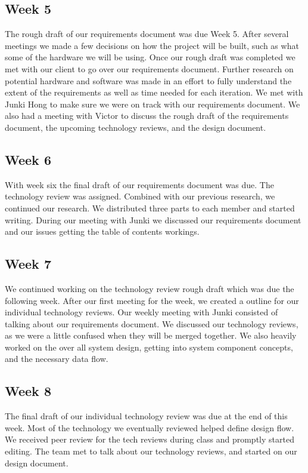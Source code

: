 \documentclass[onecolumn, draftclsnofoot,10pt, compsoc]{IEEEtran}
\begin{document}
		\subsection{Week 5}
		The rough draft of our requirements document was due Week 5. After several meetings we made a few decisions on how the project will be built, such as what some of the hardware we will be using.
		Once our rough draft was completed we met with our client to go over our requirements document.
		Further research on potential hardware and software was made in an effort to fully understand the extent of the requirements as well as time needed for each iteration.
		We met with Junki Hong to make sure we were on track with our requirements document.  We also had a meeting with Victor to discuss the rough draft of the requirements document, the upcoming technology
		reviews, and the design document.

		\subsection{Week 6}
		With week six the final draft of our requirements document was due. The technology review was assigned.
		Combined with our previous research, we continued our research. We distributed three parts to each member and started writing.
		During our meeting with Junki we discussed our requirements document and our issues getting the table of contents workings.

		\subsection{Week 7}
		We continued working on the technology review rough draft which was due the following week.
		After our first meeting for the week, we created a outline for our individual technology reviews.
		Our weekly meeting with Junki consisted of talking about our requirements document.
		We discussed our technology reviews, as we were a little confused when they will be merged together.
		We also heavily worked on the over all system design, getting into system component concepts, and the necessary data flow.

		\subsection{Week 8}
		The final draft of our individual technology review was due at the end of this week. Most of the technology we eventually reviewed helped define design flow.
		We received peer review for the tech reviews during class and promptly started editing.
		The team met to talk about our technology reviews, and started on our design document.
\end{document}
